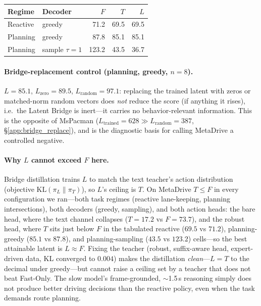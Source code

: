 \documentclass[11pt]{article}
\begin{document}
\smallskip\noindent
\begin{tabular}{llrrr}
\toprule
Regime & Decoder & $F$ & $T$ & $L$ \\
\midrule
Reactive & greedy  & 71.2 & 69.5 & 69.5 \\
Planning & greedy  & 87.8 & 85.1 & 85.1 \\
Planning & sample $\tau\!=\!1$ & 123.2 & 43.5 & 36.7 \\
\bottomrule
\end{tabular}

\paragraph{Bridge-replacement control (planning, greedy, $n=8$).}
$L=85.1$, $L_{\text{zero}}=89.5$, $L_{\text{random}}=97.1$: replacing the trained latent with
zeros or matched-norm random vectors does \emph{not} reduce the score (if anything it rises),
i.e.\ the Latent Bridge is inert---it carries no behavior-relevant information. This is the opposite
of MsPacman ($L_{\text{trained}}=628 \gg L_{\text{random}}=387$, \S\ref{app:bridge_replace}),
and is the diagnostic basis for calling MetaDrive a controlled negative.

\paragraph{Why $L$ cannot exceed $F$ here.} Bridge distillation trains $L$ to match the text teacher's
action distribution (objective $\mathrm{KL}(\pi_L\|\pi_T)$), so $L$'s ceiling is $T$. On
MetaDrive $T\!\le\!F$ in every configuration we ran---both task regimes (reactive lane-keeping,
planning intersections), both decoders (greedy, sampling), and both action heads: the bare head,
where the text channel collapses ($T\!=\!17.2$ vs $F\!=\!73.7$), and the robust head, where $T$
sits just below $F$ in the tabulated reactive ($69.5$ vs $71.2$), planning-greedy ($85.1$ vs
$87.8$), and planning-sampling ($43.5$ vs $123.2$) cells---so the best attainable latent is
$L\!\approx\!F$. Fixing the teacher (robust, suffix-aware head, expert-driven data, KL converged
to $0.004$) makes the distillation \emph{clean}---$L=T$ to the decimal under greedy---but cannot
raise a ceiling set by a teacher that does not beat Fast-Only. The slow model's frame-grounded,
$\sim$1.5\,s reasoning simply does not produce better driving decisions than the reactive policy,
even when the task demands route planning.
\end{document}
